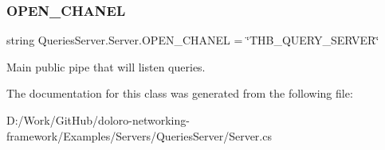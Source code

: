 \subsubsection{\texorpdfstring{O\+P\+E\+N\+\_\+\+C\+H\+A\+N\+EL}{OPEN\_CHANEL}}
{\footnotesize\ttfamily string Queries\+Server.\+Server.\+O\+P\+E\+N\+\_\+\+C\+H\+A\+N\+EL = \char`\"{}T\+H\+B\+\_\+\+Q\+U\+E\+R\+Y\+\_\+\+S\+E\+R\+V\+ER\char`\"{}\hspace{0.3cm}{\ttfamily [static]}}



Main public pipe that will listen queries. 



The documentation for this class was generated from the following file\+:\begin{DoxyCompactItemize}
\item 
D\+:/\+Work/\+Git\+Hub/doloro-\/networking-\/framework/\+Examples/\+Servers/\+Queries\+Server/Server.\+cs\end{DoxyCompactItemize}
